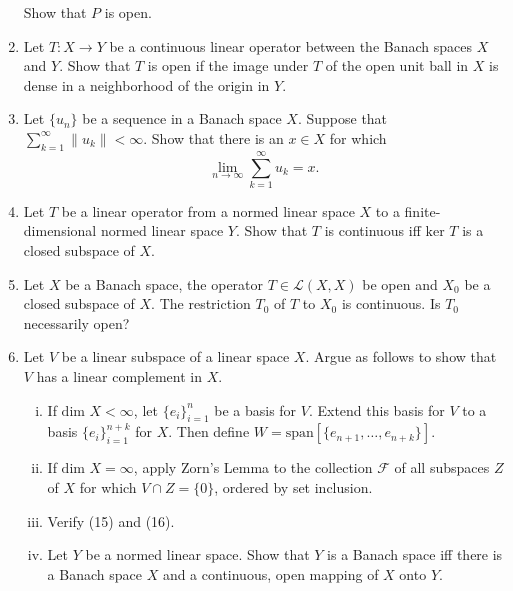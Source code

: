 \begin{enumerate}
    Show that $P$ is open.
    \item Let $T:X\to Y$ be a continuous linear operator between the Banach spaces $X$ and $Y$.
    Show that $T$ is open if the image under $T$ of the open unit ball in $X$ is dense in a neighborhood of the origin in $Y$.
    \item Let $\{u_n\}$ be a sequence in a Banach space $X$.
    Suppose that $\sum_{k=1}^\infty\|u_k\|<\infty$.
    Show that there is an $x\in X$ for which
    \[
        \lim_{n\to\infty}\sum_{k=1}^\infty u_k=x.
    \]
    \item Let $T$ be a linear operator from a normed linear space $X$ to a finite-dimensional normed linear space $Y$.
    Show that $T$ is continuous iff $\text{ker }T$ is a closed subspace of $X$.
    \item Let $X$ be a Banach space, the operator $T\in\mathcal{L}(X,X)$ be open and $X_0$ be a closed subspace of $X$.
    The restriction $T_0$ of $T$ to $X_0$ is continuous.
    Is $T_0$ necessarily open?
    \item Let $V$ be a linear subspace of a linear space $X$.
    Argue as follows to show that $V$ has a linear complement in $X$.
    \begin{enumerate}[(i)]
        \item If $\text{dim }X<\infty$, let $\{e_i\}_{i=1}^n$ be a basis for $V$.
        Extend this basis for $V$ to a basis $\{e_i\}_{i=1}^{n+k}$ for $X$.
        Then define $W=\text{span}[\{e_{n+1},\dots,e_{n+k}\}]$.
        \item If $\text{dim }X=\infty$, apply Zorn's Lemma to the collection $\mathcal{F}$ of all subspaces $Z$ of $X$ for which $V\cap Z=\{0\}$, ordered by set inclusion.
        \item Verify (15) and (16).
        \item Let $Y$ be a normed linear space.
        Show that $Y$ is a Banach space iff there is a Banach space $X$ and a continuous, open mapping of $X$ onto $Y$.
    \end{enumerate}
\end{enumerate}

